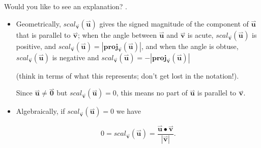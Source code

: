 \documentclass{ximera}
\begin{document}
\begin{exercise}
\begin{selectAll}
\begin{hint}
\begin{problem}
Would you like to see an explanation?
.

\begin{question}
\begin{itemize}
\item Geometrically, $scal_{\overset{\boldsymbol{\rightharpoonup}}{\mathbf{v}}}(\overset{\boldsymbol{\rightharpoonup}}{\mathbf{u}})$ gives the signed magnitude of the component of $\overset{\boldsymbol{\rightharpoonup}}{\mathbf{u}}$ that is parallel to $\overset{\boldsymbol{\rightharpoonup}}{\mathbf{v}}$; when the angle between $\overset{\boldsymbol{\rightharpoonup}}{\mathbf{u}}$ and $\overset{\boldsymbol{\rightharpoonup}}{\mathbf{v}}$ is acute, $scal_{\overset{\boldsymbol{\rightharpoonup}}{\mathbf{v}}}(\overset{\boldsymbol{\rightharpoonup}}{\mathbf{u}})$ is positive, and $scal_{\overset{\boldsymbol{\rightharpoonup}}{\mathbf{v}}}(\overset{\boldsymbol{\rightharpoonup}}{\mathbf{u}}) = |\mathbf{proj}_{\overset{\boldsymbol{\rightharpoonup}}{\mathbf{v}}}(\overset{\boldsymbol{\rightharpoonup}}{\mathbf{u}})|$, and when the angle is obtuse, $scal_{\overset{\boldsymbol{\rightharpoonup}}{\mathbf{v}}}(\overset{\boldsymbol{\rightharpoonup}}{\mathbf{u}})$  is negative and $scal_{\overset{\boldsymbol{\rightharpoonup}}{\mathbf{v}}}(\overset{\boldsymbol{\rightharpoonup}}{\mathbf{u}}) = -|\mathbf{proj}_{\overset{\boldsymbol{\rightharpoonup}}{\mathbf{v}}}(\overset{\boldsymbol{\rightharpoonup}}{\mathbf{u}})|$ 

(think in terms of what this represents; don't get lost in the notation!).

Since $\overset{\boldsymbol{\rightharpoonup}}{\mathbf{u}} \neq \overset{\boldsymbol{\rightharpoonup}}{\mathbf{0}}$ but $scal_{\overset{\boldsymbol{\rightharpoonup}}{\mathbf{v}}}(\overset{\boldsymbol{\rightharpoonup}}{\mathbf{u}}) =0$, this means no part of $\overset{\boldsymbol{\rightharpoonup}}{\mathbf{u}}$ is parallel to $\overset{\boldsymbol{\rightharpoonup}}{\mathbf{v}}$.

\item Algebraically, if $scal_{\overset{\boldsymbol{\rightharpoonup}}{\mathbf{v}}}(\overset{\boldsymbol{\rightharpoonup}}{\mathbf{u}}) =0$ we have

\[
0 = scal_{\overset{\boldsymbol{\rightharpoonup}}{\mathbf{v}}}(\overset{\boldsymbol{\rightharpoonup}}{\mathbf{u}}) = \frac{\overset{\boldsymbol{\rightharpoonup}}{\mathbf{u}} \bullet \overset{\boldsymbol{\rightharpoonup}}{\mathbf{v}}}{|\overset{\boldsymbol{\rightharpoonup}}{\mathbf{v}}|}.
\]


\end{itemize}
\end{question}
\end{problem}
\end{hint}
\end{selectAll}
\end{exercise}
\end{document}
